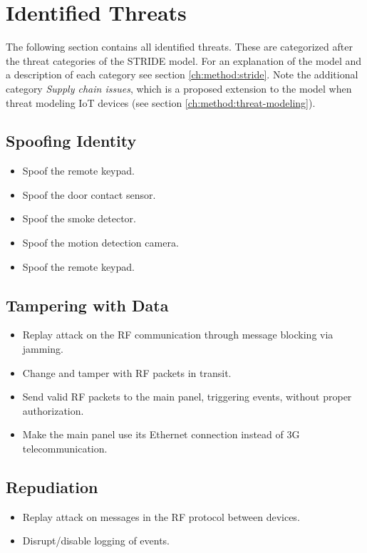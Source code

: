 \clearpage %
\section{Identified Threats} \label{ch:threat-model:threats}
The following section contains all identified threats. These are categorized after the threat categories of the STRIDE model. For an explanation of the model and a description of each category see section \ref{ch:method:stride}. Note the additional category \textit{Supply chain issues}, which is a proposed extension to the model when threat modeling IoT devices \cite{guzman2017iot} (see section \ref{ch:method:threat-modeling}).

\subsection{Spoofing Identity}
\begin{itemize}
    \item Spoof the remote keypad.
    \item Spoof the door contact sensor.
    \item Spoof the smoke detector.
    \item Spoof the motion detection camera.
    \item Spoof the remote keypad.
\end{itemize}

\subsection{Tampering with Data}
\begin{itemize}
    \item Replay attack on the RF communication through message blocking via jamming.
    \item Change and tamper with RF packets in transit.
    \item Send valid RF packets to the main panel, triggering events, without proper authorization.
    \item Make the main panel use its Ethernet connection instead of 3G telecommunication.
\end{itemize}

\subsection{Repudiation}
\begin{itemize}
    \item Replay attack on messages in the RF protocol between devices.
    \item Disrupt/disable logging of events.
\end{itemize}

